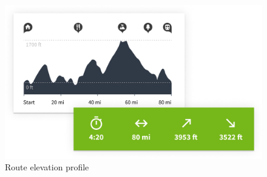 \begin{figure}[h]
    \includegraphics[width=\textwidth]{Images/komoot-route-details.png}
    \caption{Route elevation profile\cite{komoot-route-details-img}}
\end{figure}

